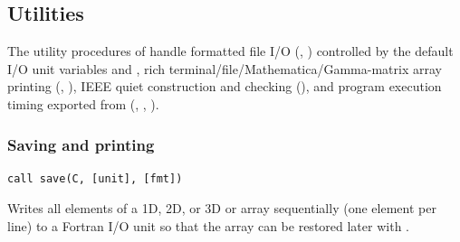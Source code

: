 \subsection{Utilities}
\label{subsec:utilities}

The utility procedures of  handle formatted file I/O (, ) controlled by the default I/O unit variables  and , rich terminal/file/Mathematica/Gamma-matrix array printing (, ), IEEE quiet  construction and checking (), and program execution timing exported from  (, , ).

\subsubsection{Saving and printing}
\label{subsubsec:saving_printing}


\lstset{language=[95]Fortran}
\begin{lstlisting}
call save(C, [unit], [fmt])
\end{lstlisting}

Writes all elements of a 1D, 2D, or 3D  or  array  sequentially (one element per line) to a Fortran I/O unit so that the array can be restored later with .

